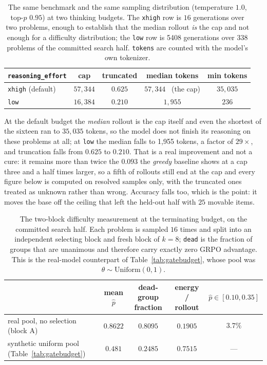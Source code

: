 \begin{table}[t]
\centering\small
\caption{The same benchmark and the same sampling distribution (temperature $1.0$,
top-$p$ $0.95$) at two thinking budgets. The \texttt{xhigh} row is $16$ generations over two
problems, enough to establish that the median rollout \emph{is} the cap and not enough for a
difficulty distribution; the \texttt{low} row is 5408 generations over 338 problems of the
committed search half. \texttt{tokens} are counted with the model's own tokenizer.}
\label{tab:opoint}
\begin{tabular}{lcccc}
\toprule
\texttt{reasoning\_effort} & cap & truncated & median tokens & min tokens \\
\midrule
\texttt{xhigh} (default) & $57{,}344$ & $0.625$ & $57{,}344$ \ (the cap) & $35{,}035$ \\
\texttt{low}             & $16{,}384$ & $0.210$ & $1{,}955$ & $236$ \\
\bottomrule
\end{tabular}
\end{table}

At the default budget the \emph{median} rollout is the cap itself and even the shortest of the
sixteen ran to $35{,}035$ tokens, so the model does not finish its reasoning on these problems
at all; at \texttt{low} the median falls to 1{,}955 tokens, a factor of $29\times$, and
truncation falls from $0.625$ to $0.210$. That is a real improvement and not a cure: it
remains more than twice the $0.093$ the \emph{greedy} baseline shows at a cap three and a half
times larger, so a fifth of rollouts still end at the cap and every figure below is computed on
resolved samples only, with the truncated ones treated as unknown rather than wrong. Accuracy
falls too, which is the point: it moves the base off the ceiling that left the held-out half
with $25$ movable items.

\begin{table}[t]
\centering\small
\caption{The two-block difficulty measurement at the terminating budget, on the committed
search half. Each problem is sampled $16$ times and split into an independent selecting block
and fresh block of $k=8$; \texttt{dead} is the fraction of groups that are unanimous and
therefore carry exactly zero GRPO advantage. This is the real-model counterpart of
Table~\ref{tab:gatebudget}, whose pool was $\theta\sim\mathrm{Uniform}(0,1)$.}
\label{tab:realpool}
\begin{tabular}{lcccc}
\toprule
 & mean $\hat p$ & dead-group fraction & energy / rollout & $\hat p\in[0.10,0.35]$ \\
\midrule
real pool, no selection (block A) & $0.8622$ & $0.8095$ & $0.1905$ & $$3.7\%$$ \\
synthetic uniform pool (Table~\ref{tab:gatebudget}) & $0.481$ & $0.2485$ & $0.7515$ & --- \\
\bottomrule
\end{tabular}
\end{table}

